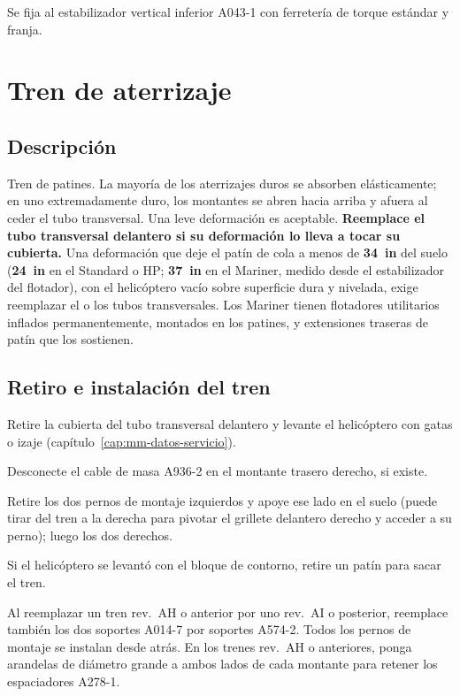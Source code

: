 Se fija al estabilizador vertical inferior A043-1 con ferretería de torque estándar y franja.

\section{Tren de aterrizaje}

\subsection{Descripción}

Tren de patines. La mayoría de los aterrizajes duros se absorben elásticamente; en uno extremadamente duro, los montantes se abren hacia arriba y afuera al ceder el tubo transversal. Una leve deformación es aceptable. \textbf{Reemplace el tubo transversal delantero si su deformación lo lleva a tocar su cubierta.} Una deformación que deje el patín de cola a menos de \textbf{34~in} del suelo (\textbf{24~in} en el Standard o HP; \textbf{37~in} en el Mariner, medido desde el estabilizador del flotador), con el helicóptero vacío sobre superficie dura y nivelada, exige reemplazar el o los tubos transversales. Los Mariner tienen flotadores utilitarios inflados permanentemente, montados en los patines, y extensiones traseras de patín que los sostienen.

\subsection{Retiro e instalación del tren}

\begin{pasos}
\item Retire la cubierta del tubo transversal delantero y levante el helicóptero con gatas o izaje (capítulo~\ref{cap:mm-datos-servicio}).
\item Desconecte el cable de masa A936-2 en el montante trasero derecho, si existe.
\item Retire los dos pernos de montaje izquierdos y apoye ese lado en el suelo (puede tirar del tren a la derecha para pivotar el grillete delantero derecho y acceder a su perno); luego los dos derechos.
\item Si el helicóptero se levantó con el bloque de contorno, retire un patín para sacar el tren.
\end{pasos}

\begin{nota}
Al reemplazar un tren rev.~AH o anterior por uno rev.~AI o posterior, reemplace también los dos soportes A014-7 por soportes A574-2. Todos los pernos de montaje se instalan desde atrás. En los trenes rev.~AH o anteriores, ponga arandelas de diámetro grande a ambos lados de cada montante para retener los espaciadores A278-1.
\end{nota}

